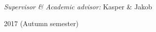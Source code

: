\begin{titlepage}
\begin{sffamily}
\begin{center}
    \Large\emph{Supervisor \& Academic advisor:} Kasper \& Jakob\textsc{}\\[1cm]


    \vfill

    {\large 2017 (Autumn semester)}
  \end{center}
  \end{sffamily}
\end{titlepage}
